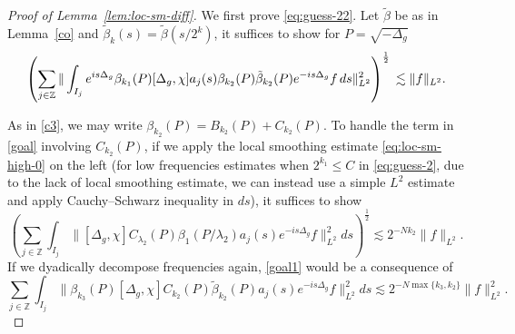 \documentclass[10pt]{amsart}
\newcommand{\la}{\lambda}
\newcommand{\1}{{\bf 1}}
\begin{document}
\begin{proof}[Proof of Lemma~\ref{lem:loc-sm-diff}]
We first prove \eqref{eq:guess-22}.
Let $\tilde\beta $  be as in Lemma~\ref{co} and $\tilde \beta_k(s)=\tilde \beta(s/2^k)$,  it suffices to show for $P=\sqrt{-\Delta_g}$
\begin{equation}\label{goal}
   \left( \sum_{j\in \mathbb{Z}} \| \int_{I_j} e^{is\Delta_{{g}}} \beta_{k_1}( P)[\Delta_g, \chi] a_j(s) \beta_{k_2}(P)\tilde\beta_{k_2}(P)  e^{-is\Delta_g}f\,ds\|^2_{L^2}\right)^{\frac12}\\
   \lesssim \|f\|_{L^2}.
\end{equation}

As in \eqref{c3}, we may write $\beta_{k_2}(P)=B_{k_2}(P)+C_{k_2}(P)$. 
To handle the term in \eqref{goal} involving $C_{k_2}(P)$, if we apply the local smoothing estimate \eqref{eq:loc-sm-high-0} on the left (for low frequencies estimates when $2^{k_1}\le C$ in \eqref{eq:guess-2}, due to the lack of local smoothing estimate, we can instead use a simple $L^2$ estimate and apply Cauchy--Schwarz inequality in $ds$),  it suffices to show  
\begin{equation}\label{goal1}
   \left( \sum_{j\in \mathbb{Z}} \int_{I_j} \| [\Delta_g, \chi] C_{\la_2}(P)\beta_1(P/\lambda_2) a_j(s) e^{-is\Delta_g}f\|^2_{L^2}ds\right)^{\frac12}\lesssim 2^{-Nk_2}\|f\|_{L^2}.
\end{equation}
If we dyadically decompose frequencies again, \eqref{goal1} would be a consequence of 
\begin{equation}\label{goal2}
 \sum_{j\in \mathbb{Z}} \int_{I_j}  \|\beta_{k_3}(P) [\Delta_g, \chi] C_{k_2}(P)\tilde\beta_{k_2}(P) a_j(s) e^{-is\Delta_g}f\|^2_{L^2}ds\lesssim 2^{-N\max\{k_3,k_2\}}\|f\|_{L^2}^2.
\end{equation}


\end{proof}
\end{document}
